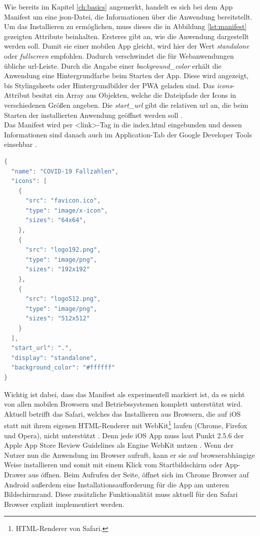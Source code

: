 Wie bereits im Kapitel \ref{ch:basics} angemerkt, handelt es sich bei dem App Manifest um eine \ac{json}-Datei, die Informationen über die Anwendung bereitstellt.
Um das Installieren zu ermöglichen, muss dieses die in Abbildung \ref{lst:manifest} gezeigten Attribute beinhalten.
Ersteres gibt an, wie die Anwendung dargestellt werden soll.
Damit sie einer mobilen App gleicht, wird hier der Wert \textit{standalone} oder \textit{fullscreen} empfohlen.
Dadurch verschwindet die für Webanwendungen übliche \ac{url}-Leiste.
Durch die Angabe einer \textit{background\_color} erhält die Anwendung eine Hintergrundfarbe beim Starten der App.
Diese wird angezeigt, bis Stylingsheets oder Hintergrundbilder der PWA geladen sind.
Das \textit{icons}-Attribut besitzt ein Array aus Objekten, welche die Dateipfade der Icons in verschiedenen Größen angeben.
Die \textit{start\_url} gibt die relativen \ac{url} an, die beim Starten der installierten Anwendung geöffnet werden soll \cite{MDNcontributors.d}.\\
Das Manifest wird per \glqq <link>\grqq{}-Tag in die index.html eingebunden und dessen Informationen sind danach auch im Application-Tab der Google Developer Tools einsehbar \cite{Caceres.2021}.\\

\begin{lstlisting}[language=Java,caption={Fertiges App Manifest der PWA},captionpos=b,label={lst:manifest}]
{
  "name": "COVID-19 Fallzahlen",
  "icons": [
    {
      "src": "favicon.ico",
      "type": "image/x-icon",
      "sizes": "64x64",
    },
    {
      "src": "logo192.png",
      "type": "image/png",
      "sizes": "192x192"
    },
    {
      "src": "logo512.png",
      "type": "image/png",
      "sizes": "512x512"
    }
  ],
  "start_url": ".",
  "display": "standalone",
  "background_color": "#ffffff"
}
\end{lstlisting}

Wichtig ist dabei, dass das Manifest als experimentell markiert ist, da es nicht von allen mobilen Browsern und Betriebssystemen komplett unterstützt wird.
Aktuell betrifft das Safari, welches das Installieren aus Browsern, die auf iOS statt mit ihrem eigenen HTML-Renderer mit WebKit\footnote{HTML-Renderer von Safari.} laufen (Chrome, Firefox und Opera), nicht unterstützt \cite{o.V..}.
Denn jede iOS App muss laut Punkt 2.5.6 der Apple App Store Review Guidelines als Engine WebKit nutzen \cite{Apple.07.06.2021}.
Wenn der Nutzer nun die Anwendung im Browser aufruft, kann er sie auf browserabhängige Weise installieren und somit mit einem Klick vom Startbildschirm oder App-Drawer aus öffnen.
Beim Aufrufen der Seite, öffnet sich im Chrome Browser auf Android außerdem eine Installationsaufforderung für die App am unteren Bildschirmrand.
Diese zusätzliche Funktionalität muss aktuell für den Safari Browser explizit implementiert werden.

